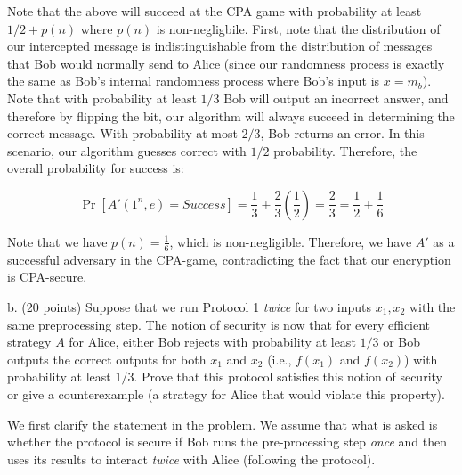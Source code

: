 \documentclass{article}
\begin{document}
\begin{enumerate}[noitemsep,topsep=\mdcompacttopsep,label=\alph*.]
\begin{mdbmarginx}{1ex}{0pt}{1ex}{0pt}
   \mdbr
{} Note that the above will succeed at the CPA game with probability at least $1/2 + p(n)$ where $p(n)$ is 
 non-negligbile. First, note that the distribution of our intercepted message is indistinguishable
 from the distribution of messages that Bob would normally send to Alice (since our randomness process is exactly
 the same as Bob's internal randomness process where Bob's input is $x = m_b$). Note that with probability
 at least $1/3$ Bob will output an incorrect answer, and therefore by flipping the bit, our
 algorithm will always succeed in determining the correct message. With probability
 at most $2/3$, Bob returns an error. In this scenario, our algorithm guesses correct with $1/2$ 
 probability. Therefore, the overall probability for success is:%
\end{mdbmarginx}%
\noindent\noindent\[%
 \Pr[A'(1^n, e) = Success] = \frac{1}{3} + \frac{2}{3}(\frac{1}{2}) = \frac{2}{3} = \frac{1}{2} + \frac{1}{6}
\]%

Note that we have $p(n) = \frac{1}{6}$, which is non-negligible. Therefore, we have $A'$ as a successful
adversary in the CPA-game, contradicting the fact that our encryption is CPA-secure.%

b. (20 points) Suppose that we run Protocol 1 \emph{twice} for two inputs $x_1,x_2$ with the same preprocessing step. The notion of security is now that for every efficient strategy $A$ for Alice, either Bob rejects with probability at least $1/3$ or Bob outputs the correct outputs for both $x_1$ and $x_2$ (i.e., $f(x_1)$ and $f(x_2)$) with probability at least $1/3$. Prove that this protocol satisfies this notion of security or give a counterexample (a strategy for Alice that would violate this property).%

We first clarify the statement in the problem. We assume that what is asked is whether the
protocol is secure if Bob runs the
pre-processing step \emph{once} and then uses its results to interact \emph{twice} with Alice (following the protocol).%


\end{enumerate}
\end{document}
